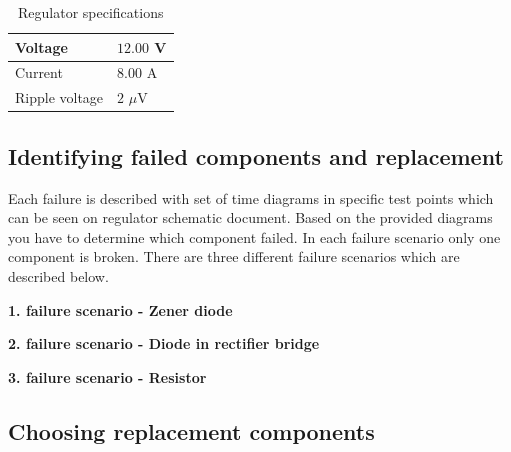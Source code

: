 \documentclass[a4paper]{article}
\begin{document}
\begin{table}[h!]
    \caption{Regulator specifications}
    \label{tab:spec}
    \begin{tabularx}{\linewidth}{|X|X|} \hline
    Voltage & $12.00$ V \\ \hline
    Current & $8.00$ A \\ \hline
    Ripple voltage & $2$ $\mu$V \\ \hline
    \end{tabularx}
\end{table}

\subsection{Identifying failed components and replacement}

Each failure is described with set of time diagrams in specific test points 
which can be seen on regulator schematic document. Based on the provided 
diagrams you have to determine which component failed. In each failure scenario
only one component is broken. There are three different failure scenarios which
are described below.

\textbf{1. failure scenario - Zener diode}

\textbf{2. failure scenario - Diode in rectifier bridge}

\textbf{3. failure scenario - Resistor}

\subsection{Choosing replacement components}
\end{document}
